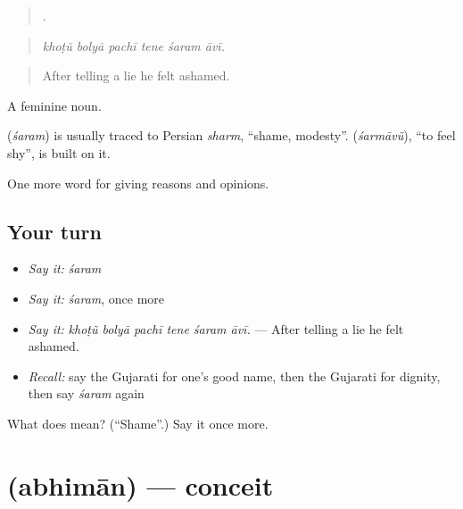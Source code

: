 \begin{quote}
     .
\end{quote}

\begin{quote}
\emph{khoṭũ bolyā pachī tene śaram āvī.}
\end{quote}

\begin{quote}
After telling a lie he felt ashamed.
\end{quote}

A feminine noun.

\begin{cousinweb}
\textbf{} (\emph{śaram}) is usually traced to Persian \emph{sharm}, \textquotedblleft{}shame, modesty\textquotedblright{}. \textbf{} (\emph{śarmāvũ}), \textquotedblleft{}to feel shy\textquotedblright{}, is built on it.
\end{cousinweb}

\begin{grammarlens}[title={What you've built}]
One more word for giving reasons and opinions.
\end{grammarlens}

\subsection*{Your turn}
\begin{itemize}
\raggedright
  \item \emph{Say it:} \emph{śaram}
  \item \emph{Say it:} \emph{śaram}, once more
  \item \emph{Say it:} \emph{khoṭũ bolyā pachī tene śaram āvī.} — After telling a lie he felt ashamed.
  \item \emph{Recall:} say the Gujarati for one's good name, then the Gujarati for dignity, then say \emph{śaram} again
\end{itemize}

\begin{tcolorbox}[breakable,colback=teal!4,colframe=teal!35!black,title={Before you move on}]
What does  mean? (\textquotedblleft{}Shame\textquotedblright{}.) Say it once more.
\end{tcolorbox}
\section[\texorpdfstring{\gu{અભિમાન} (abhimān)}{અભિમાન (abhimān)}]{ (abhimān) — conceit}

